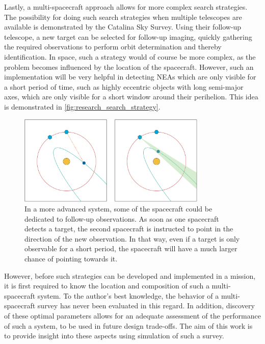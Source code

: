 Lastly, a multi-spacecraft approach allows for more complex search strategies. The possibility for doing such search strategies when multiple telescopes are available is demonstrated by the Catalina Sky Survey. Using their follow-up telescope, a new target can be selected for follow-up imaging, quickly gathering the required observations to perform orbit determination and thereby identification. In space, such a strategy would of course be more complex, as the problem becomes influenced by the location of the spacecraft. However, such an implementation will be very helpful in detecting NEAs which are only visible for a short period of time, such as highly eccentric objects with long semi-major axes, which are only visible for a short window around their perihelion. This idea is demonstrated in \autoref{fig:research_search_strategy}.\\

\begin{figure}[htbp]
 \centering
 \includegraphics[width=0.8\textwidth]{img/research_search_strategy.png}
 \caption{In a more advanced system, some of the spacecraft could be dedicated to follow-up observations. As soon as one spacecraft detects a target, the second spacecraft is instructed to point in the direction of the new observation. In that way, even if a target is only observable for a short period, the spacecraft will have a much larger chance of pointing towards it.}
 \label{fig:research_search_strategy}
\end{figure}


However, before such strategies can be developed and implemented in a mission, it is first required to know the location and composition of such a multi-spacecraft system. To the author's best knowledge, the behavior of a multi-spacecraft survey has never been evaluated in this regard. In addition, discovery of these optimal parameters allows for an adequate assessment of the performance of such a system, to be used in future design trade-offs. The aim of this work is to provide insight into these aspects using simulation of such a survey.

